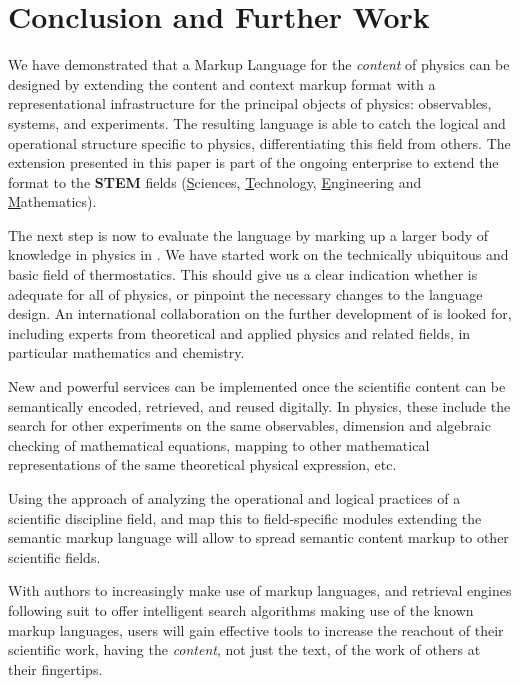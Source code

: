 \section{Conclusion and Further Work}\label{sec:conclusion}

We have demonstrated that a Markup Language for the {\emph{content}} of physics can be
designed by extending the content and context markup format {\omdoc} with a
representational infrastructure for the principal objects of physics: observables,
systems, and experiments. The resulting language {\physml} is able to catch the logical
and operational structure specific to physics, differentiating this field from others. The
extension presented in this paper is part of the ongoing enterprise to extend the {\omdoc}
format to the {\bf{STEM}} fields ({\underline{S}}ciences, {\underline{T}}echnology,
{\underline{E}}ngineering and {\underline{M}}athematics).


The next step is now to evaluate the language by marking up a larger body of knowledge in
physics in {\physml}.  We have started work on the technically ubiquitous and basic field
of thermostatics. This should give us a clear indication whether {\physml} is adequate for
all of physics, or pinpoint the necessary changes to the language design.  An
international collaboration on the further development of {\physml} is looked for,
including experts from theoretical and applied physics and related fields, in particular
mathematics and chemistry.

New and powerful services can be implemented once the scientific content can be
semantically encoded, retrieved, and reused digitally.  In physics, these include the
search for other experiments on the same observables, dimension and algebraic checking of
mathematical equations, mapping to other mathematical representations of the same
theoretical physical expression, etc.

Using the approach of analyzing the operational and logical practices of a scientific
discipline field, and map this to field-specific modules extending the semantic markup
language {\omdoc} will allow to spread semantic content markup to other scientific fields.

With authors to increasingly make use of markup languages, and retrieval engines
following suit to offer intelligent search algorithms making use of the known markup
languages, users will gain effective tools to increase the reachout of their scientific work,
having the {\emph{content}}, not just the text, of the work of others at their fingertips.


